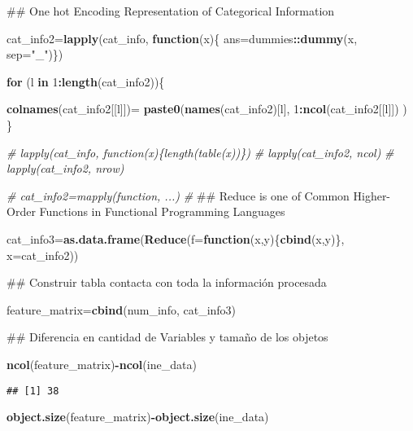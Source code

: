 \documentclass[]{article}
\newenvironment{Shaded}{\begin{snugshade}}{\end{snugshade}}
\newcommand{\KeywordTok}[1]{\textcolor[rgb]{0.13,0.29,0.53}{\textbf{#1}}}
\newcommand{\DataTypeTok}[1]{\textcolor[rgb]{0.13,0.29,0.53}{#1}}
\newcommand{\DecValTok}[1]{\textcolor[rgb]{0.00,0.00,0.81}{#1}}
\newcommand{\StringTok}[1]{\textcolor[rgb]{0.31,0.60,0.02}{#1}}
\newcommand{\CommentTok}[1]{\textcolor[rgb]{0.56,0.35,0.01}{\textit{#1}}}
\newcommand{\ControlFlowTok}[1]{\textcolor[rgb]{0.13,0.29,0.53}{\textbf{#1}}}
\newcommand{\OperatorTok}[1]{\textcolor[rgb]{0.81,0.36,0.00}{\textbf{#1}}}
\newcommand{\NormalTok}[1]{#1}
\begin{document}
\begin{Shaded}
\begin{Highlighting}[]
\NormalTok{## One hot Encoding Representation of Categorical Information}

\NormalTok{cat_info2=}\KeywordTok{lapply}\NormalTok{(cat_info, }\ControlFlowTok{function}\NormalTok{(x)\{ ans=dummies}\OperatorTok{::}\KeywordTok{dummy}\NormalTok{(x, }\DataTypeTok{sep=}\StringTok{"_"}\NormalTok{)\})}



\ControlFlowTok{for}\NormalTok{ (l }\ControlFlowTok{in} \DecValTok{1}\OperatorTok{:}\KeywordTok{length}\NormalTok{(cat_info2))\{}
  
  \KeywordTok{colnames}\NormalTok{(cat_info2[[l]])=}
\StringTok{    }
\StringTok{    }\KeywordTok{paste0}\NormalTok{(}\KeywordTok{names}\NormalTok{(cat_info2)[l], }\DecValTok{1}\OperatorTok{:}\KeywordTok{ncol}\NormalTok{(cat_info2[[l]])  )}
\NormalTok{\}}



\CommentTok{# lapply(cat_info, function(x)\{length(table(x))\})}
\CommentTok{# lapply(cat_info2, ncol)}
\CommentTok{# lapply(cat_info2, nrow)}

\CommentTok{# cat_info2=mapply(function, ...)}
\CommentTok{#   }
\NormalTok{## Reduce is one of Common Higher-Order Functions in Functional Programming Languages}

\NormalTok{cat_info3=}\KeywordTok{as.data.frame}\NormalTok{(}\KeywordTok{Reduce}\NormalTok{(}\DataTypeTok{f=}\ControlFlowTok{function}\NormalTok{(x,y)\{}\KeywordTok{cbind}\NormalTok{(x,y)\}, }\DataTypeTok{x=}\NormalTok{cat_info2))}

\NormalTok{## Construir tabla contacta con toda la información procesada}

\NormalTok{feature_matrix=}\KeywordTok{cbind}\NormalTok{(num_info, cat_info3)}

\NormalTok{## Diferencia en cantidad de Variables y tamaño de los objetos}

\KeywordTok{ncol}\NormalTok{(feature_matrix)}\OperatorTok{-}\KeywordTok{ncol}\NormalTok{(ine_data)}
\end{Highlighting}
\end{Shaded}

\begin{verbatim}
## [1] 38
\end{verbatim}

\begin{Shaded}
\begin{Highlighting}[]
\KeywordTok{object.size}\NormalTok{(feature_matrix)}\OperatorTok{-}\KeywordTok{object.size}\NormalTok{(ine_data)}
\end{Highlighting}
\end{Shaded}
\end{document}

